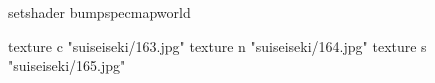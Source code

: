 setshader bumpspecmapworld

    texture c "suiseiseki/163.jpg"
    texture n "suiseiseki/164.jpg"
    texture s "suiseiseki/165.jpg"
